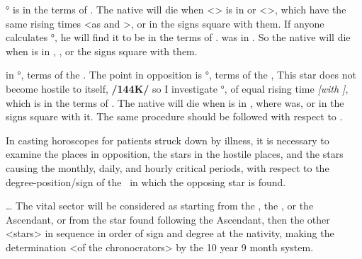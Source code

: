 \Gemini\xspace 27° is in the terms of \Venus. The native will die when <\Mars> is in \Scorpio\xspace or <\Pisces>, which have the same rising times <as \Leo\xspace and \Taurus>, or in the signs square with them. If anyone calculates \Leo\xspace 27°, he will find it to be in the terms of \Saturn. \Saturn\xspace was in \Cancer. So the native will die when \Mars\xspace is in \Cancer, \Sagittarius, or the signs square with them.

\Venus\xspace in \Scorpio\xspace 27°, terms of the \Sun. The point in opposition is \Taurus\xspace 27°, terms of the \Sun,
This star does not become hostile to itself, \textbf{/144K/} so I investigate \Scorpio\xspace 27°, of equal rising time \textsl{[with \Leo]}, which is in the terms of \Mercury. The native will die when \Venus\xspace is in \Virgo, where \Mercury\xspace was, or in the signs square with it. The same procedure should be followed with respect to \Mercury.

In casting horoscopes for patients struck down by illness, it is necessary to examine the places in opposition, the stars in the hostile places, and the stars causing the monthly, daily, and hourly critical periods, with respect to the degree-position/sign of the \Moon\, in which the opposing star is found.

\ldots
{}
The vital sector will be considered as starting from the \Sun, the \Moon, or the Ascendant, or from the star found following the Ascendant, then the other <stars> in sequence in order of sign and degree at the nativity, making the determination <of the chronocrators> by the 10 year 9 month system.


\newpage